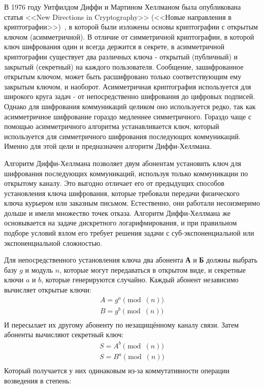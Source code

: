 \documentclass[times,specification,annotation]{itmo-student-thesis}
\begin{document}
В 1976 году Уитфилдом Диффи и Мартином Хеллманом была опубликована статья <<New Directions in Cryptography>>
(<<Новые направления в криптографии>>)~\cite{dif77}, в которой были изложены основы криптографии с открытым ключом (асимметричной).
В отличие от симметричной криптографии, в которой ключ шифрования один и всегда держится в секрете,
в асимметричной криптографии существует два различных ключа - открытый (публичный) и закрытый (секретный) на каждого пользователя.
Сообщение, зашифрованное открытым ключом, может быть расшифровано только соответствующим ему закрытым ключом, и наоборот.
Асимметричная криптография используется для широкого круга задач - от непосредственно шифрования до цифровых подписей.
Однако для шифрования коммуникаций целиком оно используется редко, так как асимметричное шифрование гораздо
медленнее симметричного.
Гораздо чаще с помощью асимметричного алгоритма устанавливается ключ, который используется для симметричного шифрования
последующих коммуникаций.
Именно для этой цели и предназначен алгоритм Диффи-Хеллмана.\par
Алгоритм Диффи-Хеллмана позволяет двум абонентам установить ключ для шифрования последующих коммуникаций,
используя только коммуникации по открытому каналу.
Это выгодно отличает его от предыдущих способов установления ключа шифрования, которые требовали передачи
физического ключа курьером или заказным письмом.
Естественно, они работали несоизмеримо дольше и имели множество точек отказа.
Алгоритм Диффи-Хеллмана же основывается на задаче дискретного логарифмирования, и при правильном подборе условий
взлом его требует решения задачи с суб-экспоненциальной или экспоненциальной сложностью.\par
Для непосредственного установления ключа два абонента \textbf{А} и \textbf{Б} должны выбрать базу $g$ и модуль $n$, которые
могут передаваться в открытом виде, и секретные ключи $a$ и $b$, которые генерируются случайно.
Каждый абонент независимо вычисляет открытые ключи:
\begin{gather*}
    A = g^a\pmod(n)\\
    B = g^b\pmod(n)\\
\end{gather*}
И пересылает их другому абоненту по незащищённому каналу связи.
Затем абоненты вычисляют секретный ключ:
\begin{gather*}
    S = A^b\pmod(n)\\
    S = B^a\pmod(n)\\
\end{gather*}
Который получается у них одинаковым из-за коммутативности операции возведения в степень:
\end{document}
